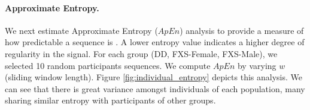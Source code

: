 \documentclass{llncs}
\begin{document}
  \paragraph{Approximate Entropy.} We next estimate Approximate Entropy ($ApEn$) analysis to provide a measure of how predictable a sequence is \cite{Restrepo:2014gs,entrophy} . A lower entropy value indicates a higher degree of regularity in the signal. For each group (DD, FXS-Female, FXS-Male), we selected 10 random participants sequences. We compute $ApEn$ by varying $w$ (sliding window length). Figure \ref{fig:individual_entropy} depicts this analysis. We can see that there is great variance amongst individuals of each population, many sharing similar entropy with participants of other groups.
\end{document}
